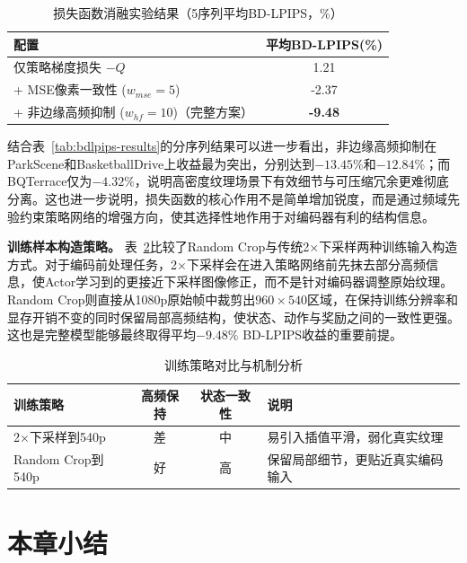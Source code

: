 \begin{table}[htbp]
  \centering
  \caption{损失函数消融实验结果（5序列平均BD-LPIPS，\%）}
  \label{tab:ablation-loss}
  \begin{tabular}{lc}
    \toprule
    \textbf{配置} & \textbf{平均BD-LPIPS(\%)} \\
    \midrule
    仅策略梯度损失 $-Q$                         & 1.21 \\
    + MSE像素一致性 ($w_{mse}=5$)              & -2.37 \\
    + 非边缘高频抑制 ($w_{hf}=10$)（完整方案）   & \textbf{-9.48} \\
    \bottomrule
  \end{tabular}
\end{table}

结合表~\ref{tab:bdlpips-results}的分序列结果可以进一步看出，非边缘高频抑制在ParkScene和BasketballDrive上收益最为突出，分别达到$-13.45\%$和$-12.84\%$；而BQTerrace仅为$-4.32\%$，说明高密度纹理场景下有效细节与可压缩冗余更难彻底分离。这也进一步说明，损失函数的核心作用不是简单增加锐度，而是通过频域先验约束策略网络的增强方向，使其选择性地作用于对编码器有利的结构信息。

\textbf{训练样本构造策略。} 表~\ref{tab:ablation-crop}比较了Random Crop与传统2$\times$下采样两种训练输入构造方式。对于编码前处理任务，2$\times$下采样会在进入策略网络前先抹去部分高频信息，使Actor学习到的更接近下采样图像修正，而不是针对编码器调整原始纹理。Random Crop则直接从1080p原始帧中裁剪出$960\times540$区域，在保持训练分辨率和显存开销不变的同时保留局部高频结构，使状态、动作与奖励之间的一致性更强。这也是完整模型能够最终取得平均$-9.48\%$ BD-LPIPS收益的重要前提。

\begin{table}[htbp]
  \centering
  \caption{训练策略对比与机制分析}
  \label{tab:ablation-crop}
  \begin{tabular}{lccp{4.6cm}}
    \toprule
    \textbf{训练策略} & \textbf{高频保持} & \textbf{状态一致性} & \textbf{说明} \\
    \midrule
    2$\times$下采样到540p   & 差 & 中 & 易引入插值平滑，弱化真实纹理 \\
    Random Crop到540p     & 好 & 高 & 保留局部细节，更贴近真实编码输入 \\
    \bottomrule
  \end{tabular}
\end{table}


\section{本章小结}

